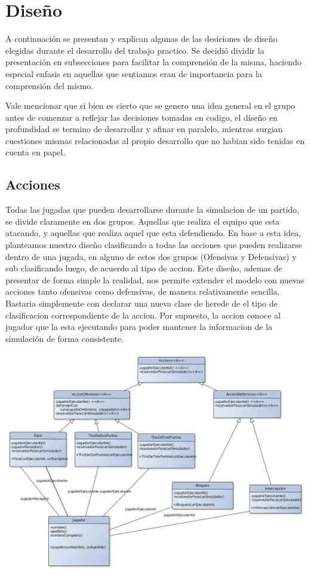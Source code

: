 \section{Diseño}
A continuación se presentan y explican algunas de las desiciones de diseño elegidas durante el desarrollo del trabajo practico.
Se decidió dividir la presentación en subsecciones para facilitar la comprensión de la misma, haciendo especial enfasis en aquellas que sentiamos eran de importancia para la comprensión del mismo.

Vale mencionar que si bien es cierto que se genero una idea general en el grupo antes de comenzar a reflejar las decisiones tomadas en codigo, el diseño en profundidad se termino de desarrollar y afinar en paralelo, mientras surgian cuestiones mismas relacionadas al propio desarrollo que no habian sido tenidas en cuenta en papel. 

\subsection{Acciones}
Todas las jugadas que pueden desarrollarse durante la simulacion de un partido, se divide claramente en dos grupos. Aquellas que realiza el equipo que esta atacando, y aquellas que realiza aquel que esta defendiendo. En base a esta idea, planteamos nuestro diseño clasificando a todas las acciones que pueden realizarse dentro de una jugada, en alguno de estos dos grupos (Ofensivas y Defensivas) y sub clasificando luego, de acuerdo al tipo de accion.
Este diseño, ademas de presentar de forma simple la realidad, nos permite extender el modelo con nuevas acciones tanto ofensivas como defensivas, de manera relativamente sencilla. Bastaria simplemente con declarar una nueva clase de herede de el tipo de clasificacion correspondiente de la accion. Por supuesto, la accion conoce al jugador que la esta ejecutando para poder mantener la informacion de la simulación de forma consistente.
\begin{center}
\includegraphics[scale=0.35]{diseno/acciones.jpg}
\end{center}

